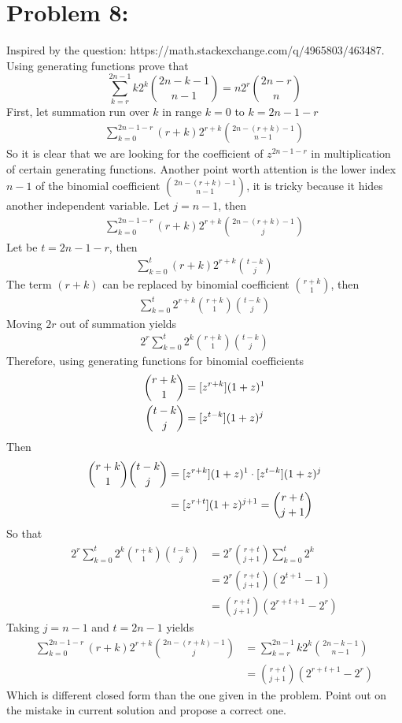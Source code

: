 ﻿\section{Problem 8:}
\label{sec:problem-8}
Inspired by the question: https://math.stackexchange.com/q/4965803/463487.
Using generating functions prove that
\begin{equation*}
    \sum_{k=r}^{2n-1} k2^k \binom{2n-k-1}{n-1} = n2^r \binom{2n-r}{n}
\end{equation*}
First, let summation run over $k$ in range $k=0$ to $k=2n-1-r$
\begin{align*}
    \sum_{k=0}^{2n-1-r} (r+k) 2^{r+k} \binom{2n-(r+k)-1}{n-1}
\end{align*}
So it is clear that we are looking for the coefficient of $z^{2n-1-r}$ in multiplication of certain generating functions.
Another point worth attention is the lower index $n-1$ of the binomial coefficient $\binom{2n-(r+k)-1}{n-1}$,
it is tricky because it hides another independent variable.
Let $j=n-1$, then
\begin{align*}
    \sum_{k=0}^{2n-1-r} (r+k) 2^{r+k} \binom{2n-(r+k)-1}{j}
\end{align*}
Let be $t=2n-1-r$, then
\begin{align*}
    \sum_{k=0}^{t} (r+k) 2^{r+k} \binom{t-k}{j}
\end{align*}
The term $(r+k)$ can be replaced by binomial coefficient $\binom{r+k}{1}$, then
\begin{align*}
    \sum_{k=0}^{t} 2^{r+k} \binom{r+k}{1} \binom{t-k}{j}
\end{align*}
Moving $2r$ out of summation yields
\begin{align*}
    2^r \sum_{k=0}^{t} 2^{k} \binom{r+k}{1} \binom{t-k}{j}
\end{align*}
Therefore, using generating functions for binomial coefficients
\begin{align*}
    \binom{r+k}{1} &= [z^{r+k}] (1+z)^1 \\
    \binom{t-k}{j} &= [z^{t-k}] (1+z)^j
\end{align*}
Then
\begin{align*}
    \binom{r+k}{1} \binom{t-k}{j} &= [z^{r+k}] (1+z)^1 \cdot [z^{t-k}] (1+z)^j \\
    &= [z^{r+t}] (1+z)^{j+1} = \binom{r+t}{j+1}
\end{align*}
So that
\begin{align*}
    2^r \sum_{k=0}^{t} 2^{k} \binom{r+k}{1} \binom{t-k}{j} &= 2^r \binom{r+t}{j+1} \sum_{k=0}^{t} 2^{k} \\
    &= 2^r \binom{r+t}{j+1} (2^{t+1} - 1) \\
    &= \binom{r+t}{j+1} (2^{r+t+1} - 2^r)
\end{align*}
Taking $j=n-1$ and $t=2n-1$ yields
\begin{align*}
    \sum_{k=0}^{2n-1-r} (r+k) 2^{r+k} \binom{2n-(r+k)-1}{j} &= \sum_{k=r}^{2n-1} k2^k \binom{2n-k-1}{n-1} \\
    &= \binom{r+t}{j+1} (2^{r+t+1} - 2^r)
\end{align*}
Which is different closed form than the one given in the problem.
Point out on the mistake in current solution and propose a correct one.


\clearpage

